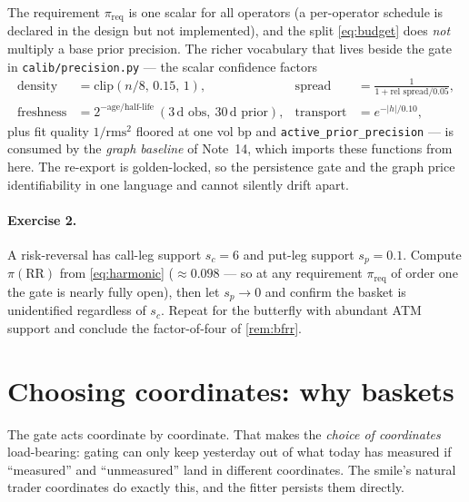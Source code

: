 \documentclass[11pt]{article}
\begin{document}
\begin{remark}
\label{rem:notused}
The requirement $\pi_{\mathrm{req}}$ is one scalar for all operators
(a per-operator schedule is declared in the design but not
implemented), and the split \eqref{eq:budget} does \emph{not} multiply
a base prior precision.  The richer vocabulary that lives beside the
gate in \texttt{calib/precision.py} --- the scalar confidence factors
\begin{equation}
\begin{aligned}
\text{density}&=\mathrm{clip}(n/8,\,0.15,\,1), &
\text{spread}&=\frac{1}{1+\text{rel spread}/0.05},\\
\text{freshness}&=2^{-\text{age}/\text{half-life}}
\ (3\,\text{d obs},\ 30\,\text{d prior}), &
\text{transport}&=e^{-|h|/0.10},
\end{aligned}
\label{eq:factors}
\end{equation}
plus fit quality $1/\text{rms}^2$ floored at one vol bp and
\texttt{active\_prior\_precision} --- is consumed by the \emph{graph
baseline} of Note~14, which imports these functions from here.  The
re-export is golden-locked, so the persistence gate and the graph
price identifiability in one language and cannot silently drift apart.
\end{remark}

\paragraph{Exercise 2.}
A risk-reversal has call-leg support $s_c=6$ and put-leg support
$s_p=0.1$.  Compute $\pi(\text{RR})$ from \eqref{eq:harmonic}
($\approx0.098$ --- so at any requirement $\pi_{\mathrm{req}}$ of order
one the gate is nearly fully open), then let $s_p\to0$ and confirm the
basket is unidentified regardless of $s_c$.  Repeat for the butterfly with
abundant ATM support and conclude the factor-of-four of
\cref{rem:bfrr}.

\section{Choosing coordinates: why baskets}
\label{sec:coords}

The gate acts coordinate by coordinate.  That makes the \emph{choice
of coordinates} load-bearing: gating can only keep yesterday out of
what today has measured if ``measured'' and ``unmeasured'' land in
different coordinates.  The smile's natural trader coordinates do
exactly this, and the fitter persists them directly.
\end{document}

